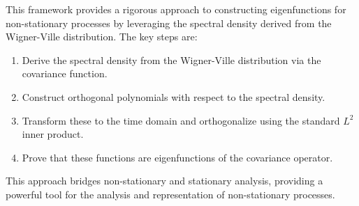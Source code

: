 \documentclass{article}
\begin{document}
This framework provides a rigorous approach to constructing eigenfunctions for non-stationary processes by leveraging the spectral density derived from the Wigner-Ville distribution. The key steps are:

\begin{enumerate}
\item Derive the spectral density from the Wigner-Ville distribution via the covariance function.
\item Construct orthogonal polynomials with respect to the spectral density.
\item Transform these to the time domain and orthogonalize using the standard $L^2$ inner product.
\item Prove that these functions are eigenfunctions of the covariance operator.
\end{enumerate}

This approach bridges non-stationary and stationary analysis, providing a powerful tool for the analysis and representation of non-stationary processes.
\end{document}

